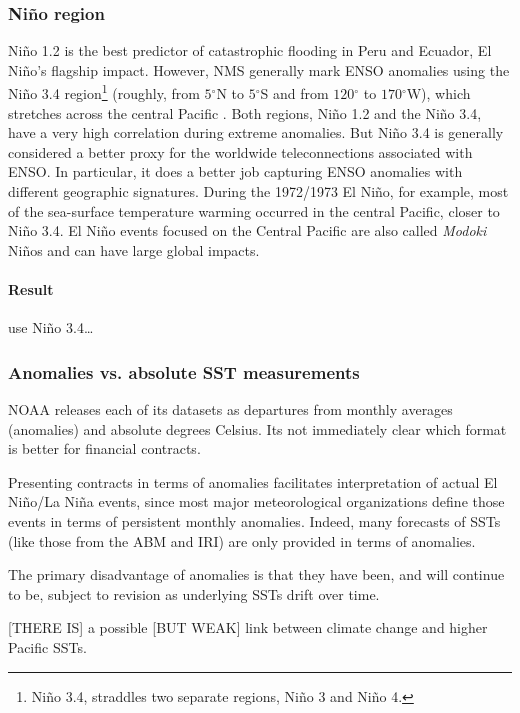 \documentclass[authoryear]{article}
\newcommand{\degreesym}{\ensuremath{^\circ}}
\begin{document}
\subsubsection{Ni\~no region}
Ni\~no 1.2 is the best predictor of catastrophic flooding in Peru and Ecuador, El Ni\~no's flagship impact. However, NMS generally mark ENSO anomalies using the Ni\~no 3.4 region\footnote{Ni\~no 3.4, straddles two separate regions, Ni\~no 3 and Ni\~no 4.} (roughly, from $5\degreesym$N to $5\degreesym$S and from $120\degreesym$ to $170\degreesym$W), which stretches across the central Pacific\cite{khalil2007Nino} \cite{barnston1997documentation}. Both regions, Ni\~no 1.2 and the Ni\~no 3.4, have a very high correlation during extreme anomalies. But Ni\~no 3.4 is generally considered a better proxy for the worldwide teleconnections associated with ENSO. In particular,  it does a better job capturing ENSO anomalies with different geographic signatures. During the 1972/1973 El Ni\~no, for example, most of the sea-surface temperature warming occurred in the central Pacific, closer to Ni\~no 3.4. El Ni\~no events focused on the Central Pacific are also called \emph{Modoki} Ni\~nos and can have large global impacts\cite{ashok2007Nino}.

\paragraph{Result}
use Ni\~no 3.4…

\subsubsection{Anomalies vs. absolute SST measurements}
NOAA releases each of its datasets as departures from monthly averages (anomalies) and absolute degrees Celsius. Its not immediately clear which format is better for financial contracts.

Presenting contracts in terms of anomalies facilitates interpretation of actual El Ni\~no/La Ni\~na events, since most major meteorological organizations define those events in terms of persistent monthly anomalies. Indeed, many forecasts of SSTs (like those from the ABM and IRI) are only provided in terms of anomalies. 

The primary disadvantage of anomalies is that they have been, and will continue to be, subject to revision as underlying SSTs drift over time. 

[THERE IS] a possible [BUT WEAK] link between climate change and higher Pacific SSTs. 
\end{document}
